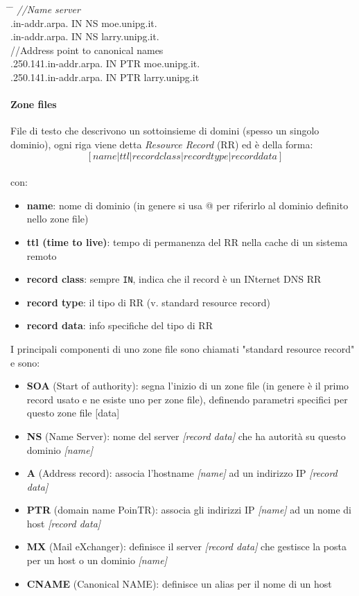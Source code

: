 \documentclass[a4paper,11pt]{article}
\def\code#1{\texttt{#1}}
\def\para#1{\paragraph{#1}\label{#1}}
\def\italic#1{\textit{#1}}
\begin{document}
\begin{itemize}
{\begin{tabbing}
\hspace*{0,5cm} \= \hspace*{5cm} \= \kill
\italic{//Name server}\\
.in-addr.arpa.\> IN NS moe.unipg.it.\\
.in-addr.arpa.\> IN NS larry.unipg.it.\\
//Address point to canonical names\\
.250.141.in-addr.arpa.\> IN PTR moe.unipg.it.\\
.250.141.in-addr.arpa. \>IN PTR larry.unipg.it\\
\end{tabbing}}
\end{itemize}
\newpage
\para{Zone files}File di testo che descrivono un sottoinsieme di domini (spesso un singolo dominio), ogni riga viene detta \italic{Resource Record} (RR) ed è della forma:\\
\[ [name | ttl | recordclass | record type | record data ]\]\\
con:
\begin{itemize}
\item \textbf{name}: nome di dominio (in genere si usa @ per riferirlo al dominio definito nello zone file)
\item \textbf{ttl (time to live)}: tempo di permanenza del RR nella cache di un sistema remoto
\item \textbf{record class}: sempre \code{IN}, indica che il record è un INternet DNS RR
\item \textbf{record type}: il tipo di RR (v. standard resource record)
\item \textbf{record data}: info specifiche del tipo di RR
\end{itemize}
I principali componenti di uno zone file sono chiamati "standard resource record" e sono:
\begin{itemize}
\item \textbf{SOA} (Start of authority): segna l'inizio di un zone file (in genere è il primo record usato e ne esiste uno per zone file), definendo parametri specifici per questo zone file [data]
\item \textbf{NS} (Name Server): nome del server \italic{[record data]} che ha autorità su questo dominio \italic{[name]}
\item \textbf{A} (Address record): associa l'hostname \italic{[name]} ad un indirizzo IP \italic{[record data]}
\item \textbf{PTR} (domain name PoinTR): associa gli indirizzi IP \italic{[name]} ad un nome di host \italic{[record data]}
\item \textbf{MX} (Mail eXchanger): definisce il server \italic{[record data]} che gestisce la posta per un host o un dominio \italic{[name]}
\item \textbf{CNAME} (Canonical NAME): definisce un alias per il nome di un host
\end{itemize}
\end{document}
